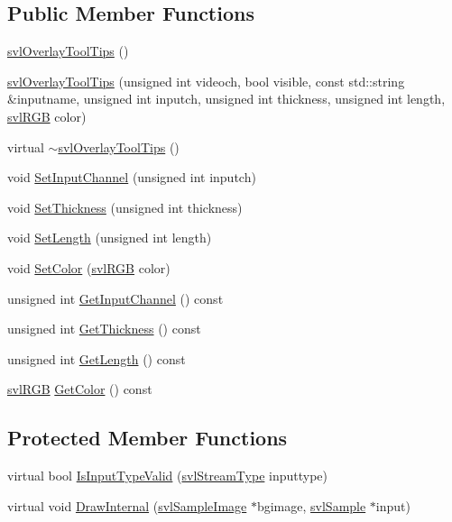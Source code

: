\subsection*{Public Member Functions}
\begin{DoxyCompactItemize}
\item 
\hyperlink{classsvl_overlay_tool_tips_a2cfbb138094f1db521ec7cd86c060f01}{svl\-Overlay\-Tool\-Tips} ()
\item 
\hyperlink{classsvl_overlay_tool_tips_aa848d987b68e3a1a7668f230fd284199}{svl\-Overlay\-Tool\-Tips} (unsigned int videoch, bool visible, const std\-::string \&inputname, unsigned int inputch, unsigned int thickness, unsigned int length, \hyperlink{structsvl_r_g_b}{svl\-R\-G\-B} color)
\item 
virtual \hyperlink{classsvl_overlay_tool_tips_a40e49c02d9a88987fb00c8ef09415a5e}{$\sim$svl\-Overlay\-Tool\-Tips} ()
\item 
void \hyperlink{classsvl_overlay_tool_tips_affa289f95318ddbceec68bfe864ade35}{Set\-Input\-Channel} (unsigned int inputch)
\item 
void \hyperlink{classsvl_overlay_tool_tips_aa077d707668802f6b3a021fd6ecf0168}{Set\-Thickness} (unsigned int thickness)
\item 
void \hyperlink{classsvl_overlay_tool_tips_a27973121afdc64a83d22ecd9151734df}{Set\-Length} (unsigned int length)
\item 
void \hyperlink{classsvl_overlay_tool_tips_af643e9f71255e85e407558ea535cc63a}{Set\-Color} (\hyperlink{structsvl_r_g_b}{svl\-R\-G\-B} color)
\item 
unsigned int \hyperlink{classsvl_overlay_tool_tips_ad0d1a6ed63ea5c58666f13dfe25671a9}{Get\-Input\-Channel} () const 
\item 
unsigned int \hyperlink{classsvl_overlay_tool_tips_aecab6109a96d0e2f57f733a0ea8ee707}{Get\-Thickness} () const 
\item 
unsigned int \hyperlink{classsvl_overlay_tool_tips_addad557317dfbd5174ca7b0a9c3fd1f9}{Get\-Length} () const 
\item 
\hyperlink{structsvl_r_g_b}{svl\-R\-G\-B} \hyperlink{classsvl_overlay_tool_tips_a07830858648255c59a803944a55a12f8}{Get\-Color} () const 
\end{DoxyCompactItemize}
\subsection*{Protected Member Functions}
\begin{DoxyCompactItemize}
\item 
virtual bool \hyperlink{classsvl_overlay_tool_tips_a644fbbf28f0021f2a3e28530d5772f59}{Is\-Input\-Type\-Valid} (\hyperlink{svl_definitions_8h_aa00696d338a58db361335a01fd11e122}{svl\-Stream\-Type} inputtype)
\item 
virtual void \hyperlink{classsvl_overlay_tool_tips_a0f0e0ac0860ceb1ce0b57f63d3789d44}{Draw\-Internal} (\hyperlink{classsvl_sample_image}{svl\-Sample\-Image} $\ast$bgimage, \hyperlink{classsvl_sample}{svl\-Sample} $\ast$input)
\end{DoxyCompactItemize}
